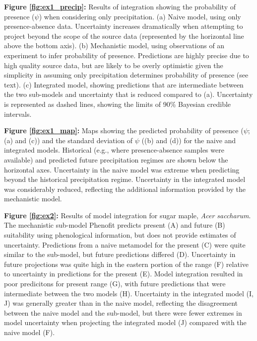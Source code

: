 \documentclass[11pt]{article}
\begin{document}
\begin{flushleft}
\textbf{Figure \ref{fig:ex1_precip}:}
	Results of integration showing the probability of presence (\(\psi\)) when considering only precipitation.
	(a) Naive model, using only presence-absence data. Uncertainty increases dramatically when attempting to project beyond the scope of the source data (represented by the horizontal line above the bottom axis).
	(b) Mechanistic model, using observations of an experiment to infer probability of presence. Predictions are highly precise due to high quality source data, but are likely to be overly optimistic given the simplicity in assuming only precipitation determines probability of presence (see text).
	(c) Integrated model, showing predictions that are intermediate between the two sub-models and uncertainty that is reduced compared to (a).
	Uncertainty is represented as dashed lines, showing the limits of 90\% Bayesian credible intervals.

\textbf{Figure \ref{fig:ex1_map}:}
	Maps showing the predicted probability of presence (\(\psi\); (a) and (c)) and the standard deviation of \(\psi\) ((b) and (d)) for the naive and integrated models.
	Historical (e.g., where presence-absence samples were available) and predicted future precipitation regimes are shown below the horizontal axes.
	Uncertainty in the naive model was extreme when predicting beyond the historical precipitation regime.
	Uncertainty in the integrated model was considerably reduced, reflecting the additional information provided by the mechanistic model.


\textbf{Figure \ref{fig:ex2}:}
	Results of model integration for sugar maple, \emph{Acer saccharum}.
	The mechanistic sub-model Phenofit predicts present (A) and future (B) suitability using phenological information, but does not provide estimates of uncertainty.
	Predictions from a naive metamodel for the present (C) were quite similar to the sub-model, but future predictions  differed (D).
	Uncertainty in future projections was quite high in the eastern portion of the range (F) relative to uncertainty in predictions for the present (E).
	Model integration resulted in poor predicitons for present range (G), with future predictions that were intermediate between the two models (H).
	Uncertainty in the integrated model (I, J) was generally greater than in the naive model, reflecting the disagreement between the naive model and the sub-model, but there were fewer extremes in model uncertainty when projecting the integrated model (J) compared with the naive model (F).
	


\end{flushleft}
\end{document}

